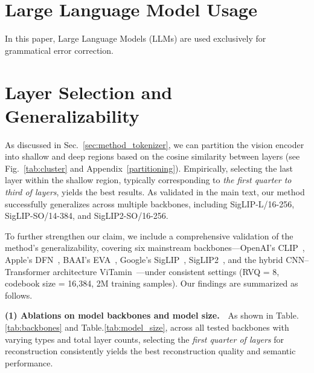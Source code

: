 \newpage

\appendix

\section{Large Language Model Usage}
In this paper, Large Language Models (LLMs) are used exclusively for grammatical error correction.

\section{Layer Selection and Generalizability}
\label{appendix_generalizability}

% 

As discussed in Sec.~\ref{sec:method_tokenizer}, we can partition the vision encoder into shallow and deep regions based on the cosine similarity between layers (see Fig.~\ref{tab:cluster} and Appendix~\ref{partitioning}). Empirically, selecting the last layer within the shallow region, typically corresponding to \textit{the first quarter to third of layers}, yields the best results.
As validated in the main text, our method successfully generalizes across multiple backbones, including SigLIP-L/16-256, SigLIP-SO/14-384, and SigLIP2-SO/16-256. 



To further strengthen our claim, we include a comprehensive validation of the method’s generalizability, covering six mainstream backbones—OpenAI’s CLIP~\citep{radford2021clip}, Apple’s DFN~\citep{fang2023dfn}, BAAI’s EVA~\citep{eva02}, Google’s SigLIP~\citep{zhai2023siglip}, SigLIP2~\citep{tschannen2025siglip2}, and the hybrid CNN–Transformer architecture ViTamin~\citep{chen2024vitamin}—under consistent settings (RVQ = 8, codebook size = 16,384, 2M training samples). Our findings are summarized as follows.

\textbf{(1) Ablations on model backbones and model size.}~~As shown in Table.\ref{tab:backbones} and Table.\ref{tab:model_size}, across all tested backbones with varying types and total layer counts, selecting the \textit{first quarter of layers} for reconstruction consistently yields the best reconstruction quality and semantic performance.

